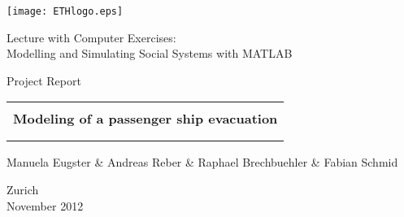 
\thispagestyle{empty}

\begin{center}
\texttt{[image: ETHlogo.eps]}

\bigskip


\bigskip


\bigskip


\LARGE{ 	Lecture with Computer Exercises:\\ }
\LARGE{ Modelling and Simulating Social Systems with MATLAB\\}

\bigskip

\bigskip

\small{Project Report}\\

\bigskip

\bigskip

\bigskip

\bigskip


\begin{tabular}{|c|}
\hline
\\
\textbf{\LARGE{Modeling of a passenger ship evacuation}}\\
\textbf{\LARGE{}}\\
\\
\hline
\end{tabular}
\bigskip

\bigskip

\bigskip

\LARGE{Manuela Eugster \& Andreas Reber \& Raphael Brechbuehler \& Fabian Schmid }



\bigskip

\bigskip

\bigskip

\bigskip

\bigskip

\bigskip

\bigskip

\bigskip

Zurich\\
November 2012\\

\end{center}


